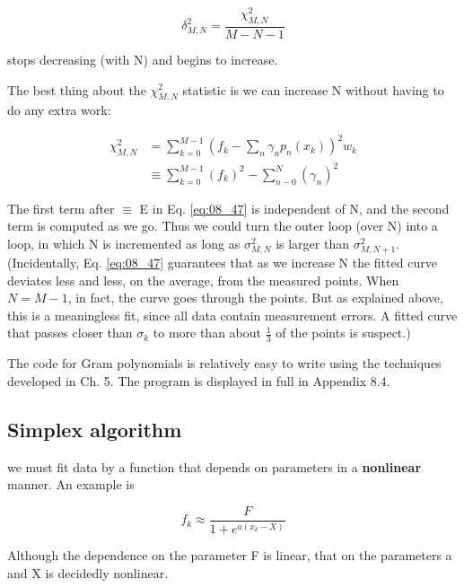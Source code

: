 \begin{equation*}
\delta_{M,N}^{2} = \frac{\chi_{M,N}^{2}}{M-N-1}
\end{equation*}

stops decreasing (with N) and begins to increase.

The best thing about the $\chi_{M,N}^{2}$ statistic is we can increase N without having to do any extra work:

\begin{equation}\label{eq:08_47}
    \begin{split}
        \chi_{M,N}^{2} &= \sum_{k=0}^{M-1} (f_{k} - \sum_{n} \gamma_{n}p_{n}(x_{k}))^2 w_{k} \\
        &\equiv \sum_{k=0}^{M-1} (f_{k})^{2} - \sum_{n-0}^{N} (\gamma_{n})^2
    \end{split}
\end{equation}

The first term after $\equiv$ E in Eq. \ref{eq:08_47} is independent of N, and the second term is computed as we go. Thus we could turn the outer loop (over N) into a  loop, in which N is incremented as long as $\sigma_{M,N}^{2}$ is larger than $\sigma_{M,N+1}^{2}$. (Incidentally, Eq. \ref{eq:08_47} guarantees that as we increase N the fitted curve deviates less and less, on the average, from the measured points. When $N = M-1$, in fact, the curve goes through the points. But as explained above, this is a meaningless fit, since all data contain measurement errors. A fitted curve that passes closer than $\sigma_{k}$ to more than about $\frac{1}{3}$ of the points is suspect.)

The code for Gram polynomials is relatively easy to write using the techniques developed in Ch. 5. The program is displayed in full in Appendix 8.4.

\subsection{Simplex algorithm}\label{chap:08_02_03}
 we must fit data by a function that depends on parameters in a \textbf{nonlinear} manner. An example is

\begin{equation}\label{eq:08_48}
f_{k} \approx \frac{F}{1+e^{a(x_{k}-X)}}
\end{equation}

Although the dependence on the parameter F is linear, that on the parameters a and X is decidedly nonlinear.

